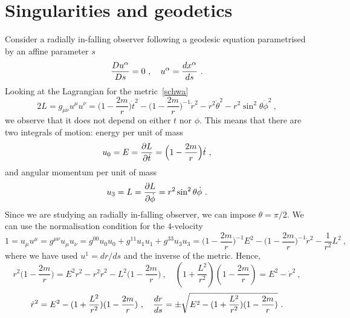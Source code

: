 \section{Singularities and geodetics}

    Consider a radially in-falling observer following a geodesic equation parametrised by an affine parameter $s$ 
    \begin{equation*}
        \frac{Du^\alpha}{Ds} = 0 ~, \quad u^\alpha = \frac{dx^\alpha}{ds}  ~.
    \end{equation*}
    Looking at the Lagrangian for the metric~\eqref{schwa}
    \begin{equation*} 
        2 L = g_{\mu\nu} u^\mu u^\nu = \Big ( 1 - \frac{2m}{r} \Big ) \dot t^2 - \Big ( 1 - \frac{2m}{r} \Big)^{-1} \dot r^2 - r^2 \dot \theta^2 - r^2 \sin^2 \theta \dot \phi^2 ~,
    \end{equation*}
    we observe that it does not depend on either $t$ nor $\phi$. This means that there are two integrals of motion: energy per unit of mass 
    \begin{equation*}
        u_0 = E = \frac{\partial L}{\partial\dot t} = \Big ( 1 - \frac{2m}{r} \Big ) \dot t ~,
    \end{equation*}
    and angular momentum per unit of mass 
    \begin{equation*}
        u_3 = L = \frac{\partial L}{\partial\dot \phi} = r^2 \sin^2 \theta \dot \phi ~.
    \end{equation*}
    Since we are studying an radially in-falling observer, we can impose $\theta = \pi/2$. We can use the normalisation condition for the $4$-velocity 
    \begin{equation*}
        1 = u_\mu u^\mu = g^{\mu\nu} u_\mu u_\nu = g^{00} u_0 u_0 + g^{11} u_1 u_1 + g^{33} u_3 u_3 = \Big(1 - \frac{2m}{r} \Big )^{-1} E^2 - \Big(1 - \frac{2m}{r} \Big )^{-1} \dot r^2 - \frac{1}{r^2} L^2 ~,
    \end{equation*}
    where we have used $u^1 = dr / ds$ and the inverse of the metric. Hence, 
    \begin{equation*}
        r^2 \Big(1 - \frac{2m}{r} \Big ) = E^2 r^2 - r^2 \dot r^2 - L^2 \Big(1 - \frac{2m}{r} \Big ) ~, \quad (1 + \frac{L^2}{r^2}) (1 - \frac{2m}{r} ) = E^2 - \dot r^2 ~,
    \end{equation*}
    \begin{equation*}
        \dot r^2 = E^2 - (1 + \frac{L^2}{r^2}) (1 - \frac{2m}{r} ) ~, \quad \frac{dr}{ds} = \pm \sqrt{E^2 - (1 + \frac{L^2}{r^2}) (1 - \frac{2m}{r} )} ~.
    \end{equation*}
